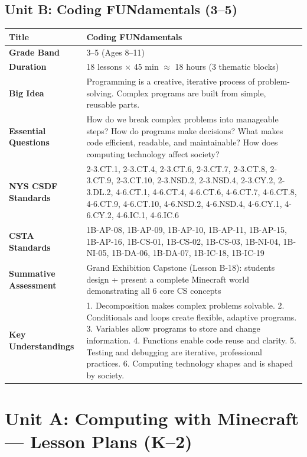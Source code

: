 \documentclass[11pt,letterpaper]{article}
\begin{document}
\newpage
\subsection{Unit B: Coding FUNdamentals (3--5)}
\label{sub:UnitBCodingFUNdamentals35}

\begin{longtable}{|L{0.28\textwidth}|L{0.65\textwidth}|}
\hline
\textbf{Title}  & Coding FUNdamentals  \\
\hline
\textbf{Grade Band}  & 3--5 (Ages 8--11)  \\
\hline
\textbf{Duration}  & 18 lessons $\times$ 45 min \ensuremath{\approx} 18 hours (3 thematic blocks)  \\
\hline
\textbf{Big Idea}  & Programming is a creative, iterative process of problem-solving. Complex programs are built from simple, reusable parts.  \\
\hline
\textbf{Essential Questions}  & How do we break complex problems into manageable steps? How do programs make decisions? What makes code efficient, readable, and maintainable? How does computing technology affect society?  \\
\hline
\textbf{NYS CSDF Standards}  & 2-3.CT.1, 2-3.CT.4, 2-3.CT.6, 2-3.CT.7, 2-3.CT.8, 2-3.CT.9, 2-3.CT.10, 2-3.NSD.2, 2-3.NSD.4, 2-3.CY.2, 2-3.DL.2, 4-6.CT.1, 4-6.CT.4, 4-6.CT.6, 4-6.CT.7, 4-6.CT.8, 4-6.CT.9, 4-6.CT.10, 4-6.NSD.2, 4-6.NSD.4, 4-6.CY.1, 4-6.CY.2, 4-6.IC.1, 4-6.IC.6  \\
\hline
\textbf{CSTA Standards}  & 1B-AP-08, 1B-AP-09, 1B-AP-10, 1B-AP-11, 1B-AP-15, 1B-AP-16, 1B-CS-01, 1B-CS-02, 1B-CS-03, 1B-NI-04, 1B-NI-05, 1B-DA-06, 1B-DA-07, 1B-IC-18, 1B-IC-19  \\
\hline
\textbf{Summative Assessment}  & Grand Exhibition Capstone (Lesson B-18): students design + present a complete Minecraft world demonstrating all 6 core CS concepts  \\
\hline
\textbf{Key Understandings}  & 1. Decomposition makes complex problems solvable. 2. Conditionals and loops create flexible, adaptive programs. 3. Variables allow programs to store and change information. 4. Functions enable code reuse and clarity. 5. Testing and debugging are iterative, professional practices. 6. Computing technology shapes and is shaped by society.  \\
\hline
\end{longtable}

\newpage
\section{Unit A: Computing with Minecraft --- Lesson Plans (K--2)}
\label{sec:UnitAComputingwithMinecraftLessonPlansK2}
\end{document}
